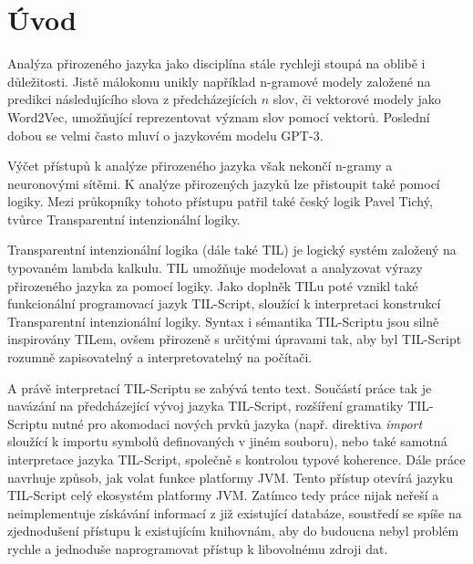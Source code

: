 \chapter{Úvod}
\label{sec:Introduction}


Analýza přirozeného jazyka jako disciplína stále rychleji stoupá na oblibě i důležitosti. Jistě
málokomu unikly například n-gramové modely založené na predikci následujícího slova
z předcházejících $n$ slov, či vektorové modely jako Word2Vec, umožňující reprezentovat význam
slov pomocí vektorů. Poslední dobou se velmi často mluví o jazykovém modelu GPT-3.

Výčet přístupů k analýze přirozeného jazyka však nekončí n-gramy a neuronovými sítěmi. K analýze
přirozených jazyků lze přistoupit také pomocí logiky. Mezi průkopníky tohoto přístupu patřil také
český logik Pavel Tichý, tvůrce Transparentní intenzionální logiky.

Transparentní intenzionální logika (dále také TIL) je logický systém založený na typovaném lambda
kalkulu. TIL umožňuje modelovat a analyzovat výrazy přirozeného jazyka za pomocí logiky. Jako
doplněk TILu poté vznikl také funkcionální programovací jazyk TIL-Script, sloužící k interpretaci
konstrukcí Transparentní intenzionální logiky. Syntax i sémantika TIL-Scriptu jsou silně inspirovány
TILem, ovšem přirozeně s určitými úpravami tak, aby byl TIL-Script rozumně zapisovatelný
a interpretovatelný na počítači.

A právě interpretací TIL-Scriptu se zabývá tento text. Součástí práce tak je navázání
na předcházející vývoj jazyka TIL-Script, rozšíření gramatiky TIL-Scriptu nutné pro akomodaci nových
prvků jazyka (např. direktiva \textit{import} sloužící k importu symbolů definovaných v jiném
souboru), nebo také samotná interpretace jazyka TIL-Script, společně s kontrolou typové koherence.
Dále práce navrhuje způsob, jak volat funkce platformy JVM. Tento přístup otevírá jazyku TIL-Script
celý ekosystém platformy JVM. Zatímco tedy práce nijak neřeší a neimplementuje získávání informací
z již existující databáze, soustředí se spíše na zjednodušení přístupu k existujícím knihovnám, aby
do budoucna nebyl problém rychle a jednoduše naprogramovat přístup k libovolnému zdroji dat.


